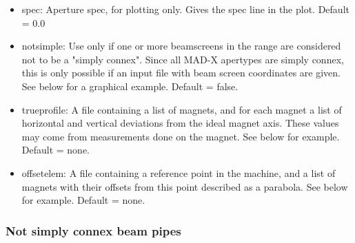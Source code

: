 \begin{itemize}
\begin{itemize}
	\item spec: Aperture spec, for plotting only. Gives the spec line in the plot. Default = 0.0 
	\item notsimple: Use only if one or more beamscreens in the range are considered not to  be a "simply connex". Since all MAD-X apertypes are simply connex, this is only possible  if an input file with beam screen coordinates are given. See below for a graphical example. Default = false. 
	\item trueprofile: A file containing a list of magnets, and for each magnet a list of horizontal and vertical deviations from the ideal magnet axis. These values may come from measurements done on the magnet. See below for example. Default = none. 
	\item offsetelem: A file containing a reference point in the machine, and a list of magnets with their offsets from this point described as a parabola. See below for example. Default = none. 
\end{itemize}
\end{itemize}

\subsubsection{Not simply connex beam pipes} 


